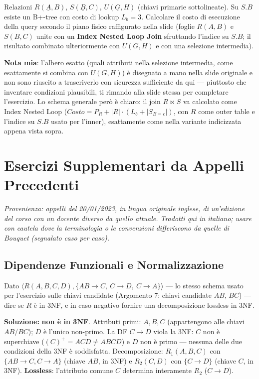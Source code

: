 \documentclass[12pt, a4paper]{article}
\newcounter{esercizio}[section]
\begin{document}
\begin{tcolorbox}[colback=lightergray!10, colframe=tocsec, title=\textbf{Esercizio}]
Relazioni $R(\underline{A},B)$, $S(\underline{B},C)$, $U(\underline{G},H)$ (chiavi primarie sottolineate). Su $S.B$ esiste un B+-tree con costo di lookup $L_b=3$. Calcolare il costo di esecuzione della query secondo il piano fisico raffigurato nella slide (foglie $R(A,B)$ e $S(B,C)$ unite con un \textbf{Index Nested Loop Join} sfruttando l'indice su $S.B$; il risultato combinato ulteriormente con $U(G,H)$ e con una selezione intermedia).
\end{tcolorbox}
\textbf{Nota mia}: l'albero esatto (quali attributi nella selezione intermedia, come esattamente si combina con $U(G,H)$) è disegnato a mano nella slide originale e non sono riuscito a trascriverlo con sicurezza sufficiente da qui — piuttosto che inventare condizioni plausibili, ti rimando alla slide stessa per completare l'esercizio. Lo schema generale però è chiaro: il join $R \bowtie S$ va calcolato come Index Nested Loop ($Costo = P_R + |R|\cdot(L_b + |S_{B=c}|)$, con $R$ come outer table e l'indice su $S.B$ usato per l'inner), esattamente come nella variante indicizzata appena vista sopra.

\section{Esercizi Supplementari da Appelli Precedenti}
\textit{Provenienza: appelli del 20/01/2023, in lingua originale inglese, di un'edizione del corso con un docente diverso da quello attuale. Tradotti qui in italiano; usare con cautela dove la terminologia o le convenzioni differiscono da quelle di Bouquet (segnalato caso per caso).}

\subsection{Dipendenze Funzionali e Normalizzazione}

\begin{tcolorbox}[colback=lightergray!10, colframe=tocsec, title=\textbf{Esercizio 1}]
Dato $\langle R(A,B,C,D), \{AB\to C,\ C\to D,\ C\to A\}\rangle$ — lo stesso schema usato per l'esercizio sulle chiavi candidate (Argomento 7: chiavi candidate $AB$, $BC$) — dire se $R$ è in 3NF, e in caso negativo fornire una decomposizione lossless in 3NF.
\end{tcolorbox}
\textbf{Soluzione:} \textbf{non è in 3NF}. Attributi primi: $A,B,C$ (appartengono alle chiavi $AB$/$BC$); $D$ è l'unico non-primo. La DF $C\to D$ viola la 3NF: $C$ non è superchiave ($(C)^+=ACD\neq ABCD$) e $D$ non è primo — nessuna delle due condizioni della 3NF è soddisfatta. Decomposizione: $R_1(A,B,C)$ con $\{AB\to C, C\to A\}$ (chiave $AB$, in 3NF) e $R_2(C,D)$ con $\{C\to D\}$ (chiave $C$, in 3NF). \textbf{Lossless}: l'attributo comune $C$ determina interamente $R_2$ ($C\to D$).
\end{document}
